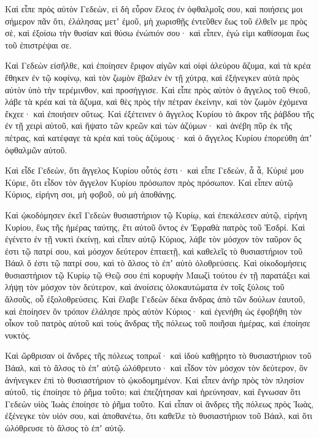{Καὶ εἶπε πρὸς αὐτὸν Γεδεὼν, εἰ δὴ εὗρον ἔλεος ἐν ὀφθαλμοῖς σου, καὶ ποιήσεις μοι σήμερον πᾶν ὅτι, ἐλάλησας μετʼ ἐμοῦ,
μὴ χωρισθῇς ἐντεῦθεν ἕως τοῦ ἐλθεῖν με πρὸς σὲ, καὶ ἐξοίσω τὴν θυσίαν καὶ θύσω ἐνώπιόν σου· καὶ εἶπεν, ἐγώ εἰμι καθίσομαι ἕως τοῦ ἐπιστρέψαι σε.
\par }{\PP {}Καὶ Γεδεὼν εἰσῆλθε, καὶ ἐποίησεν ἔριφον αἰγῶν καὶ οἰφὶ ἀλεύρου ἄζυμα, καὶ τὰ κρέα ἔθηκεν ἐν τῷ κοφίνῳ, καὶ τὸν ζωμὸν ἔβαλεν ἐν τῇ χύτρᾳ, καὶ ἐξήνεγκεν αὐτὰ πρὸς αὐτὸν ὑπὸ τὴν τερέμινθον, καὶ προσήγγισε.
Καὶ εἶπε πρὸς αὐτὸν ὁ ἄγγελος τοῦ Θεοῦ, λάβε τὰ κρέα καὶ τὰ ἄζυμα, καὶ θὲς πρὸς τὴν πέτραν ἐκείνην, καὶ τὸν ζωμὸν ἐχόμενα ἔκχεε· καὶ ἐποιήσεν οὕτως.
Καὶ ἐξέτεινεν ὁ ἄγγελος Κυρίου τὸ ἄκρον τῆς ῥάβδου τῆς ἐν τῇ χειρὶ αὐτοῦ, καὶ ἥψατο τῶν κρεῶν καὶ τὼν ἀζύμων· καὶ ἀνέβη πῦρ ἐκ τῆς πέτρας, καὶ κατέφαγε τὰ κρέα καὶ τοὺς ἀζύμους· καὶ ὁ ἄγγελος Κυρίου ἐπορεύθη ἀπʼ ὀφθαλμῶν αὐτοῦ.
\par }{\PP {}Καὶ εἶδε Γεδεὼν, ὅτι ἄγγελος Κυρίου οὗτός ἐστι· καὶ εἶπε Γεδεὼν, ἆ ἆ, Κύριέ μου Κύριε, ὅτι εἶδον τὸν ἄγγελον Κυρίου πρόσωπον πρὸς πρόσωπον.
Καὶ εἶπεν αὐτῷ Κύριος, εἰρήνη σοι, μὴ φοβοῦ, οὐ μὴ ἀποθάνῃς.
\par }{\PP {}Καὶ ᾠκοδόμησεν ἐκεῖ Γεδεὼν θυσιαστήριον τῷ Κυρίῳ, καὶ ἐπεκάλεσεν αὐτῷ, εἰρήνη Κυρίου, ἕως τῆς ἡμέρας ταύτης, ἔτι αὐτοῦ ὄντος ἐν Ἐφραθὰ πατρὸς τοῦ Ἐσδρί.
Καὶ ἐγένετο ἐν τῇ νυκτὶ ἐκείνῃ, καὶ εἶπεν αὐτῷ Κύριος, λάβε τὸν μόσχον τὸν ταῦρον ὅς ἐστι τῷ πατρί σου, καὶ μόσχον δεύτερον ἑπταετῇ, καὶ καθελεῖς τὸ θυσιαστήριον τοῦ Βάαλ ὅ ἐστι τῷ πατρί σου, καὶ τὸ ἄλσος τὸ ἐπʼ αὐτὸ ὀλοθρεύσεις.
Καὶ οἰκοδομήσεις θυσιαστήριον τῷ Κυρίῳ τῷ Θεῷ σου ἐπὶ κορυφὴν Μαωζὶ τούτου ἐν τῇ παρατάξει καὶ λήψῃ τὸν μόσχον τὸν δεύτερον, καὶ ἀνοίσεις ὁλοκαυτώματα ἐν τοῖς ξύλοις τοῦ ἄλσοῦς, οὗ ἐξολοθρεύσεις.
Καὶ ἔλαβε Γεδεὼν δέκα ἄνδρας ἀπὸ τῶν δούλων ἑαυτοῦ, καὶ ἐποίησεν ὃν τρόπον ἐλάλησε πρὸς αὐτὸν Κύριος· καὶ ἐγενήθη ὡς ἐφοβήθη τὸν οἶκον τοῦ πατρὸς αὐτοῦ καὶ τοὺς ἄνδρας τῆς πόλεως τοῦ ποιῆσαι ἡμέρας, καὶ ἐποίησε νυκτός.
\par }{\PP {}Καὶ ὤρθρισαν οἱ ἄνδρες τῆς πόλεως τοπρωΐ· καὶ ἰδοὺ καθῄρητο τὸ θυσιαστήριον τοῦ Βάαλ, καὶ τὸ ἄλσος τὸ ἐπʼ αὐτῷ ὠλόθρευτο· καὶ εἶδον τὸν μόσχον τὸν δεύτερον, ὃν ἀνήνεγκεν ἐπὶ τὸ θυσιαστήριον τὸ ᾠκοδομημένον.
Καὶ εἶπεν ἀνὴρ πρὸς τὸν πλησίον αὐτοῦ, τίς ἐποίησε τὸ ῥῆμα τοῦτο; καὶ ἐπεζήτησαν καὶ ἠρεύνησαν, καὶ ἔγνωσαν ὅτι Γεδεὼν υἱὸς Ἰωὰς ἐποίησε τὸ ῥῆμα τοῦτο.
Καὶ εἶπαν οἱ ἄνδρες τῆς πόλεως πρὸς Ἰωὰς, ἐξένεγκε τὸν υἱόν σου, καὶ ἀποθανέτω, ὅτι καθεῖλε τὸ θυσιαστήριον τοῦ Βάαλ, καὶ ὅτι ὠλόθρευσε τὸ ἄλσος τὸ ἐπʼ αὐτῷ.
}
